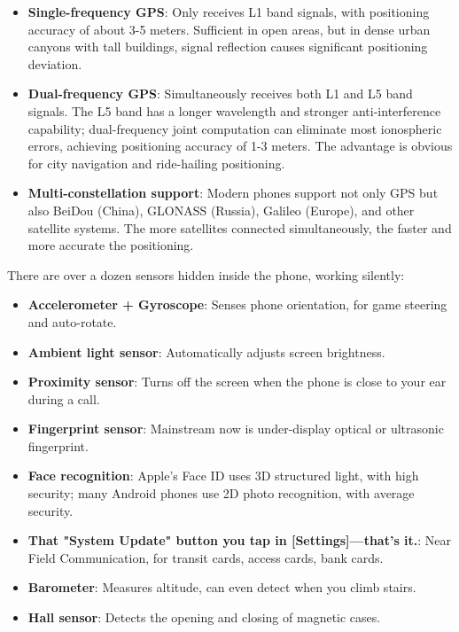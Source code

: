 \begin{itemize}
  \item \textbf{Single-frequency GPS}: Only receives L1 band signals, with positioning accuracy of about 3-5 meters. Sufficient in open areas, but in dense urban canyons with tall buildings, signal reflection causes significant positioning deviation.
  \item \textbf{Dual-frequency GPS}: Simultaneously receives both L1 and L5 band signals. The L5 band has a longer wavelength and stronger anti-interference capability; dual-frequency joint computation can eliminate most ionospheric errors, achieving positioning accuracy of 1-3 meters. The advantage is obvious for city navigation and ride-hailing positioning.
  \item \textbf{Multi-constellation support}: Modern phones support not only GPS but also BeiDou (China), GLONASS (Russia), Galileo (Europe), and other satellite systems. The more satellites connected simultaneously, the faster and more accurate the positioning.
\end{itemize}


There are over a dozen sensors hidden inside the phone, working silently:

\begin{itemize}
  \item \textbf{Accelerometer + Gyroscope}: Senses phone orientation, for game steering and auto-rotate.
  \item \textbf{Ambient light sensor}: Automatically adjusts screen brightness.
  \item \textbf{Proximity sensor}: Turns off the screen when the phone is close to your ear during a call.
  \item \textbf{Fingerprint sensor}: Mainstream now is under-display optical or ultrasonic fingerprint.
  \item \textbf{Face recognition}: Apple's Face ID uses 3D structured light, with high security; many Android phones use 2D photo recognition, with average security.
  \item \textbf{That "System Update" button you tap in [Settings]—that's it.}: Near Field Communication, for transit cards, access cards, bank cards.
  \item \textbf{Barometer}: Measures altitude, can even detect when you climb stairs.
  \item \textbf{Hall sensor}: Detects the opening and closing of magnetic cases.
\end{itemize}

